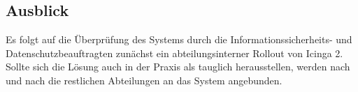 \subsection{Ausblick}
\label{sec:Ausblick}
Es folgt auf die Überprüfung des Systems durch die Informationssicherheits- und Datenschutzbeauftragten zunächst ein abteilungsinterner Rollout von \glqq{}Icinga 2\grqq{}. Sollte sich die Lösung auch in der Praxis als tauglich herausstellen, werden nach und nach die restlichen Abteilungen an das System angebunden.